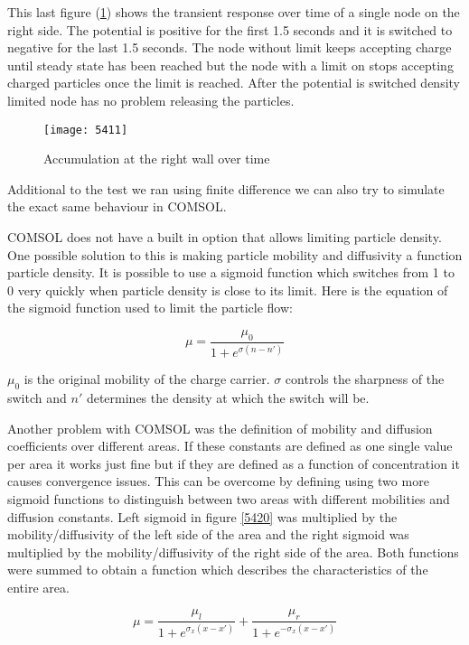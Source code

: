 This last figure (\ref{5411}) shows the transient response  over time of a single node on the right side. The potential is positive for the first 1.5 seconds and it is switched to negative for the last 1.5 seconds. The node without limit keeps accepting charge until steady state has been reached but the node with a limit on stops accepting charged particles once the limit is reached. After the potential is switched density limited node has no problem releasing the particles.


\begin{figure}[!htp]
\centering
\texttt{[image: 5411]}
\caption{Accumulation at the right wall over time} 
\label{5411}
\end{figure}

Additional to the test we ran using finite difference we can also try to simulate the exact same behaviour in COMSOL. 

COMSOL does not have a built in option that allows limiting particle density. One possible solution to this is making particle mobility and diffusivity a function particle density. It is possible to use a sigmoid function which switches from 1 to 0 very quickly when particle density is close to its limit. Here is the equation of the sigmoid function used to limit the particle flow:

\begin{equation}
\mu = \frac{\mu_{0}}{1+e^{\sigma(n-n')}}
\label{mur}
\end{equation} 

$\mu_0$ is the original mobility of the charge carrier. $\sigma$ controls the sharpness of the switch and $n'$ determines the density at which the switch will be. 

Another problem with COMSOL was the definition of mobility and diffusion coefficients over different areas. If these constants are defined as one single value per area it works just fine but if they are defined as a function of concentration it causes convergence issues. This can be overcome by defining using two more sigmoid functions to distinguish between two areas with different mobilities and diffusion constants. Left sigmoid in figure \ref{5420}  was multiplied by the mobility/diffusivity of the left side of the area and the right sigmoid was multiplied by the mobility/diffusivity of the right side of the area. Both functions were summed to obtain a function which describes the characteristics of the entire area.

\begin{equation}
\mu=\frac{\mu_{l}}{1+e^{\sigma_x(x-x')}}+\frac{\mu_{r}}{1+e^{-\sigma_x(x-x')}}
\end{equation}


